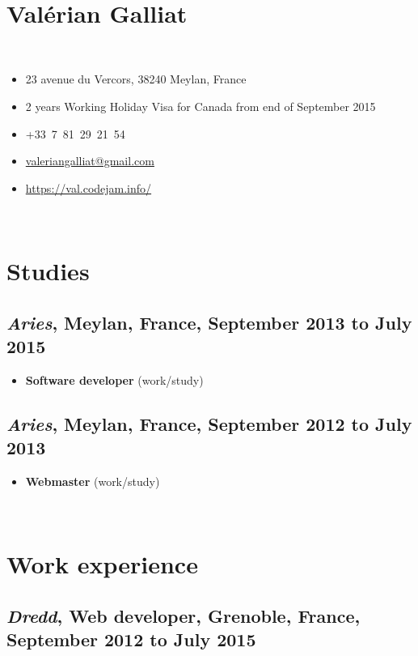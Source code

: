 \documentclass[a4paper]{article}
\begin{document}
~

\section*{\huge Valérian Galliat}

~

\begin{itemize}
  \item 23 avenue du Vercors, 38240 Meylan, France
  \item 2 years Working Holiday Visa for Canada from end of September 2015
  \item +33~7~81~29~21~54
  \item \href{mailto:valeriangalliat@gmail.com}{valeriangalliat@gmail.com}
  \item \url{https://val.codejam.info/}
\end{itemize}

~

\section*{Studies}

\subsection*{
  \textit{Aries},
  Meylan, France,
  September 2013 to July 2015
}

\begin{itemize}
  \item
    \textbf{Software developer}
    {\footnotesize (work/study)}
\end{itemize}

\subsection*{
  \textit{Aries},
  Meylan, France,
  September 2012 to July 2013
}

\begin{itemize}
  \item
    \textbf{Webmaster}
    {\footnotesize (work/study)}
\end{itemize}

~

\section*{Work experience}

\subsection*{
  \textit{Dredd},
  \textbf{Web developer},
  Grenoble, France,
  September 2012 to July 2015
}
\end{document}
